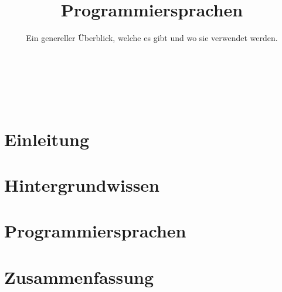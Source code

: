 

\title{Programmiersprachen}
\subtitle{Ein genereller Überblick, welche es gibt und wo sie verwendet werden.}




\backgroundTitle
\begin{frame}
    \thispagestyle{empty}
    \begin{columns}
        \column{0.6\paperwidth}
        \color{hhuBlau}
        \LARGE \inserttitle\\[\baselineskip]
        \large \insertauthor
    \end{columns}
\end{frame}
\backgroundNormal

\section{Einleitung}



\section{Hintergrundwissen}





\section{Programmiersprachen}



\section{Zusammenfassung}








